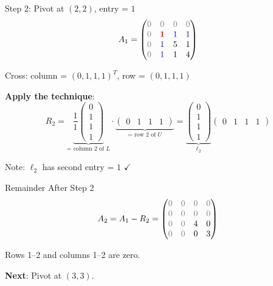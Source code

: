 \documentclass[10pt]{beamer}
\theoremstyle{definition}
\newcommand{\pvt}[1]{{\color{red}\mathbf{#1}}}       %
\newcommand{\crs}[1]{{\color{blue}#1}}                %
\newcommand{\rem}[1]{{\color{gray}#1}}                %
\begin{document}
\begin{frame}{Step 2: Pivot at $(2,2)$, entry = $1$}
$$A_1 = \begin{pmatrix}
\rem{0} & \rem{0} & \rem{0} & \rem{0} \\
\rem{0} & \pvt{1} & \crs{1} & \crs{1} \\
\rem{0} & \crs{1} & 5 & 1 \\
\rem{0} & \crs{1} & 1 & 4
\end{pmatrix}$$

Cross: column = $(0, 1, 1, 1)^T$, row = $(0, 1, 1, 1)$

\vfill
\textbf{Apply the technique}:
$$R_2 = \underbrace{\frac{1}{1} \begin{pmatrix} 0 \\ 1 \\ 1 \\ 1 \end{pmatrix}}_{\text{= column 2 of } L}
\cdot \underbrace{\begin{pmatrix} 0 & 1 & 1 & 1 \end{pmatrix}}_{\text{= row 2 of } U}
= \underbrace{\begin{pmatrix} 0 \\ 1 \\ 1 \\ 1 \end{pmatrix}}_{\ell_2}
\begin{pmatrix} 0 & 1 & 1 & 1 \end{pmatrix}$$

Note: $\ell_2$ has second entry = $1$ $\checkmark$
\end{frame}

\begin{frame}{Remainder After Step 2}
$$A_2 = A_1 - R_2 = \begin{pmatrix}
\rem{0} & \rem{0} & \rem{0} & \rem{0} \\
\rem{0} & \rem{0} & \rem{0} & \rem{0} \\
\rem{0} & \rem{0} & 4 & 0 \\
\rem{0} & \rem{0} & 0 & 3
\end{pmatrix}$$

\vfill
Rows 1--2 and columns 1--2 are \rem{zero}.

\vfill
\textbf{Next}: Pivot at $(3,3)$.
\end{frame}
\end{document}
